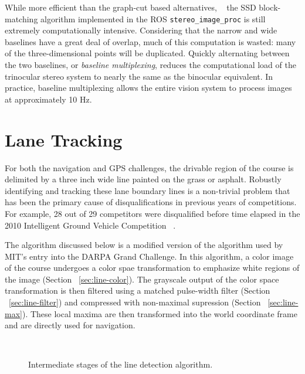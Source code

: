 \documentclass[11pt,twocolumn]{article}
\begin{document}
While more efficient than the graph-cut based alternatives, ~\cite{stereo} the
SSD block-matching algorithm implemented in the ROS
\texttt{stereo\_image\_proc} is still extremely computationally intensive.
Considering that the narrow and wide baselines have a great deal of overlap,
much of this computation is wasted: many of the three-dimensional points will
be duplicated. Quickly alternating between the two baselines, or
\textit{baseline multiplexing}, reduces the computational load of the
trinocular stereo system to nearly the same as the binocular equivalent. In
practice, baseline multiplexing allows the entire vision system to process
images at approximately 10 Hz.

\section{Lane Tracking}
\label{sec:line}
For both the navigation and GPS challenges, the drivable region of the course
is delimited by a three inch wide line painted on the grass or asphalt.
Robustly identifying and tracking these lane boundary lines is a non-trivial
problem that has been the primary cause of disqualifications in previous years
of competitions. For example, 28 out of 29 competitors were disqualified before
time elapsed in the 2010 Intelligent Ground Vehicle Competition
~\cite{igvc_results10}.

The algorithm discussed below is a modified version of the algorithm used by
MIT's entry into the DARPA Grand Challenge. In this algorithm, a color image
of the course undergoes a color spae transformation to emphasize white regions
of the image (Section ~\ref{sec:line-color}). The grayscale output of the color
space transformation is then filtered using a matched pulse-width filter
(Section ~\ref{sec:line-filter}) and compressed with non-maximal supression
(Section ~\ref{sec:line-max}). These local maxima are then transformed into
the world coordinate frame and are directly used for navigation.

\begin{figure*}
	\\
	\caption{Intermediate stages of the line detection algorithm.}
	\label{fig:lane-all}
\end{figure*}
\end{document}

